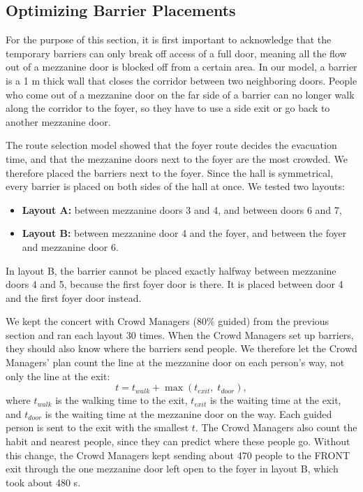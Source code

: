 \subsection{Optimizing Barrier Placements}
For the purpose of this section, it is first important to acknowledge that the temporary barriers can only break off access of a full door, meaning all the flow out of a mezzanine door is blocked off from a certain area. In our model, a barrier is a 1 m thick wall that closes the corridor between two neighboring doors. People who come out of a mezzanine door on the far side of a barrier can no longer walk along the corridor to the foyer, so they have to use a side exit or go back to another mezzanine door.

The route selection model showed that the foyer route decides the evacuation time, and that the mezzanine doors next to the foyer are the most crowded. We therefore placed the barriers next to the foyer. Since the hall is symmetrical, every barrier is placed on both sides of the hall at once. We tested two layouts:
\begin{itemize}
    \item \textbf{Layout A:} between mezzanine doors 3 and 4, and between doors 6 and 7,
    \item \textbf{Layout B:} between mezzanine door 4 and the foyer, and between the foyer and mezzanine door 6.
\end{itemize}
In layout B, the barrier cannot be placed exactly halfway between mezzanine doors 4 and 5, because the first foyer door is there. It is placed between door 4 and the first foyer door instead.

We kept the concert with Crowd Managers (80\% guided) from the previous section and ran each layout 30 times. When the Crowd Managers set up barriers, they should also know where the barriers send people. We therefore let the Crowd Managers' plan count the line at the mezzanine door on each person's way, not only the line at the exit:
\begin{equation}
    t = t_{walk} + \max\left( t_{exit}, \; t_{door} \right),
\end{equation}
where $t_{walk}$ is the walking time to the exit, $t_{exit}$ is the waiting time at the exit, and $t_{door}$ is the waiting time at the mezzanine door on the way. Each guided person is sent to the exit with the smallest $t$. The Crowd Managers also count the habit and nearest people, since they can predict where these people go. Without this change, the Crowd Managers kept sending about 470 people to the FRONT exit through the one mezzanine door left open to the foyer in layout B, which took about 480 s.

